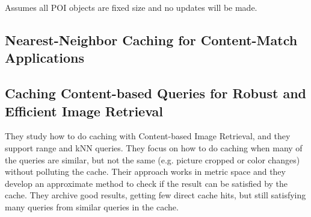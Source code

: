 Assumes all POI objects are fixed size and no updates will be made. \cite{cirslddme}





\subsection{Nearest-Neighbor Caching for Content-Match Applications}

\cite{nnccma}



\subsection{Caching Content-based Queries for Robust and Efficient Image Retrieval}

They study how to do caching with Content-based Image Retrieval, and they support range and kNN queries. They focus on how to do caching when many of the queries are similar, but not the same (e.g. picture cropped or color changes) without polluting the cache. Their approach works in metric space and they develop an approximate method to check if the result can be satisfied by the cache. They archive good results, getting few direct cache hits, but still satisfying many queries from similar queries in the cache.

\cite{ccqreir}




